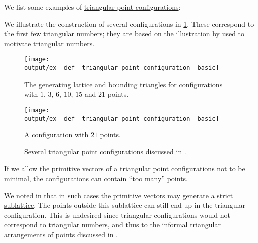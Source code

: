 \begin{example}\label{ex:def:triangular_point_configuration}
  We list some examples of \hyperref[def:triangular_point_configuration]{triangular point configurations}:

  \begin{thmenum}
     We illustrate the construction of several configurations in \cref{fig:ex:def:triangular_point_configuration/basic}. These correspond to the first few \hyperref[def:triangular_number]{triangular numbers}; they are based on the illustration by  used to motivate triangular numbers.

    \begin{figure}[!ht]
      \begin{subcaptionblock}[t]{0.45\textwidth}
        \centering
        \texttt{[image: output/ex\_\_def\_\_triangular\_point\_configuration\_\_basic]}
        \caption{The generating lattice and bounding triangles for configurations with \( 1 \), \( 3 \), \( 6 \), \( 10 \), \( 15 \) and \( 21 \) points.}\label{fig:ex:def:triangular_point_configuration/basic/triangles}
      \end{subcaptionblock}
      \hfill
      \begin{subcaptionblock}[t]{0.45\textwidth}
        \centering
        \texttt{[image: output/ex\_\_def\_\_triangular\_point\_configuration\_\_basic]}
        \caption{A configuration with \( 21 \) points.}\label{fig:ex:def:triangular_point_configuration/basic/21}
      \end{subcaptionblock}
      \caption{Several \hyperref[def:triangular_point_configuration]{triangular point configurations} discussed in .}\label{fig:ex:def:triangular_point_configuration/basic}
    \end{figure}

     If we allow the primitive vectors of a \hyperref[def:triangular_point_configuration]{triangular point configurations} not to be minimal, the configurations can contain \enquote{too many} points.

    We noted in  that in such cases the primitive vectors may generate a strict \hyperref[def:point_sublattice]{sublattice}. The points outside this sublattice can still end up in the triangular configuration. This is undesired since triangular configurations would not correspond to triangular numbers, and thus to the informal triangular arrangements of points discussed in .


\end{thmenum}
\end{example}
